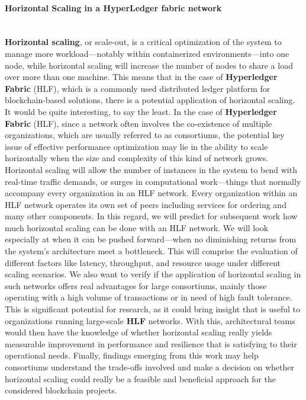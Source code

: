 \paragraph{Horizontal Scaling in a HyperLedger fabric network}\mbox{}\\

\textbf{Horizontal scaling}, or scale-out, is a critical optimization of the system to manage more workload—notably within containerized environments—into one node, while horizontal scaling will increase the number of nodes to share a load over more than one machine.
This means that in the case of \textbf{Hyperledger Fabric} (HLF), which is a commonly used distributed ledger platform for blockchain-based solutions, there is a potential application of horizontal scaling. It would be quite interesting, to say the least. In the case of \textbf{Hyperledger Fabric} (HLF), since a network often involves the co-existence of multiple organizations, which are usually referred to as consortiums, the potential key issue of effective performance optimization may lie in the ability to scale horizontally when the size and complexity of this kind of network grows. Horizontal scaling will allow the number of instances in the system to bend with real-time traffic demands, or surges in computational work—things that normally accompany every organization in an HLF network. Every organization within an HLF network operates its own set of peers including services for ordering and many other components.
In this regard, we will predict for subsequent work how much horizontal scaling can be done with an HLF network. We will look especially at when it can be pushed forward—when no diminishing returns from the system's architecture meet a bottleneck. This will comprise the evaluation of different factors like latency, throughput, and resource usage under different scaling scenarios. We also want to verify if the application of horizontal scaling in such networks offers real advantages for large consortiums, mainly those operating with a high volume of transactions or in need of high fault tolerance.
This is significant potential for research, as it could bring insight that is useful to organizations running large-scale \textbf{HLF} networks. With this, architectural teams would then have the knowledge of whether horizontal scaling really yields measurable improvement in performance and resilience that is satisfying to their operational needs. Finally, findings emerging from this work may help consortiums understand the trade-offs involved and make a decision on whether horizontal scaling could really be a feasible and beneficial approach for the considered blockchain projects.



